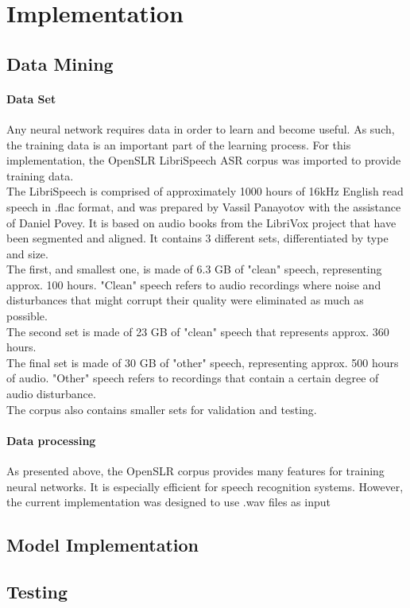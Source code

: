 \chapter{Implementation}\label{ch:implementation}

\section{Data Mining}
\subsubsection{Data Set}
Any neural network requires data in order to learn and become useful. As such, the training data is an important part of the learning process. For this implementation, the OpenSLR LibriSpeech ASR corpus was imported to provide training data.\\

The LibriSpeech is comprised of approximately 1000 hours of 16kHz English read speech in .flac format, and was prepared by Vassil Panayotov with the assistance of Daniel Povey. It is based on audio books from the LibriVox project that have been segmented and aligned. It contains 3 different sets, differentiated by type and size.\\ 
The first, and smallest one, is made of 6.3 GB of "clean" speech, representing approx. 100 hours. "Clean" speech refers to audio recordings where noise and disturbances that might corrupt their quality were eliminated as much as possible.\\ 
The second set is made of 23 GB of "clean" speech that represents approx. 360 hours.\\
The final set is made of 30 GB of "other" speech, representing approx. 500 hours of audio. "Other" speech refers to recordings that contain a certain degree of audio disturbance.\\
The corpus also contains smaller sets for validation and testing.\\

\subsubsection{Data processing}
As presented above, the OpenSLR corpus provides many features for training neural networks. It is especially efficient for speech recognition systems. However, the current implementation was designed to use .wav files as input







\section{Model Implementation}






\section{Testing}










